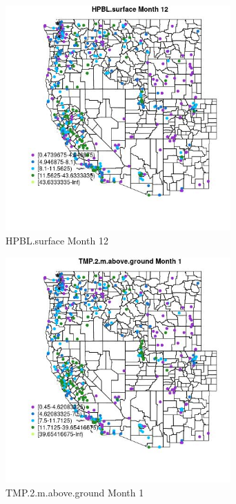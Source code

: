 \begin{figure} 
\centering  
\includegraphics[width=0.77\textwidth]{Code_Outputs/ML_input_report_ML_input_PM25_Step5_part_d_de_duplicated_aves_ML_input_MapObsMo12HPBLsurface.jpg} 
\caption{\label{fig:ML_input_report_ML_input_PM25_Step5_part_d_de_duplicated_aves_ML_inputMapObsMo12HPBLsurface}HPBL.surface Month 12} 
\end{figure} 
 

\begin{figure} 
\centering  
\includegraphics[width=0.77\textwidth]{Code_Outputs/ML_input_report_ML_input_PM25_Step5_part_d_de_duplicated_aves_ML_input_MapObsMo1TMP2maboveground.jpg} 
\caption{\label{fig:ML_input_report_ML_input_PM25_Step5_part_d_de_duplicated_aves_ML_inputMapObsMo1TMP2maboveground}TMP.2.m.above.ground Month 1} 
\end{figure} 
 

